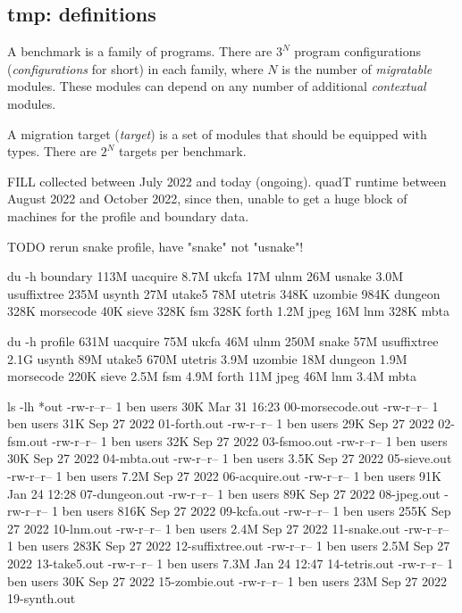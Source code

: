 


\subsection{tmp: definitions}

A benchmark is a family of programs.
There are $3^N$ program configurations (\emph{configurations} for short)
in each family, where $N$ is the number of \emph{migratable} modules.
These modules can depend on any number of additional \emph{contextual} modules.

A migration target (\emph{target}) is a set of modules that should be equipped
with types.
There are $2^N$ targets per benchmark.

FILL collected between July 2022 and today (ongoing).
quadT runtime between August 2022 and October 2022, since then, unable to get a huge
block of machines for the profile and boundary data.

TODO rerun snake profile, have "snake" not "usnake"!

du -h boundary
113M	uacquire
8.7M	ukcfa
17M	ulnm
26M	usnake
3.0M	usuffixtree
235M	usynth
27M	utake5
78M	utetris
348K	uzombie
984K	dungeon
328K	morsecode
40K	sieve
328K	fsm
328K	forth
1.2M	jpeg
16M	lnm
328K	mbta

du -h profile
631M	uacquire
75M	ukcfa
46M	ulnm
250M	snake
57M	usuffixtree
2.1G	usynth
89M	utake5
670M	utetris
3.9M	uzombie
18M	dungeon
1.9M	morsecode
220K	sieve
2.5M	fsm
4.9M	forth
11M	jpeg
46M	lnm
3.4M	mbta

ls -lh *out
-rw-r--r-- 1 ben users  30K Mar 31 16:23 00-morsecode.out
-rw-r--r-- 1 ben users  31K Sep 27  2022 01-forth.out
-rw-r--r-- 1 ben users  29K Sep 27  2022 02-fsm.out
-rw-r--r-- 1 ben users  32K Sep 27  2022 03-fsmoo.out
-rw-r--r-- 1 ben users  30K Sep 27  2022 04-mbta.out
-rw-r--r-- 1 ben users 3.5K Sep 27  2022 05-sieve.out
-rw-r--r-- 1 ben users 7.2M Sep 27  2022 06-acquire.out
-rw-r--r-- 1 ben users  91K Jan 24 12:28 07-dungeon.out
-rw-r--r-- 1 ben users  89K Sep 27  2022 08-jpeg.out
-rw-r--r-- 1 ben users 816K Sep 27  2022 09-kcfa.out
-rw-r--r-- 1 ben users 255K Sep 27  2022 10-lnm.out
-rw-r--r-- 1 ben users 2.4M Sep 27  2022 11-snake.out
-rw-r--r-- 1 ben users 283K Sep 27  2022 12-suffixtree.out
-rw-r--r-- 1 ben users 2.5M Sep 27  2022 13-take5.out
-rw-r--r-- 1 ben users 7.3M Jan 24 12:47 14-tetris.out
-rw-r--r-- 1 ben users  30K Sep 27  2022 15-zombie.out
-rw-r--r-- 1 ben users  23M Sep 27  2022 19-synth.out



